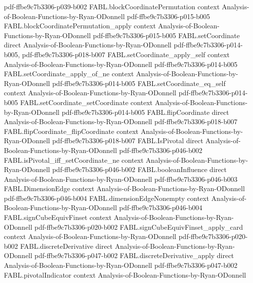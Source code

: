\begin{theorem}
  {pdf-ffbe9c7b3306-p039-b002}
\proofstep
  {FABL.blockCoordinatePermutation}
  {context}
  {Analysis-of-Boolean-Functions-by-Ryan-ODonnell}
  {pdf-ffbe9c7b3306-p015-b005}
\proofstep
  {FABL.blockCoordinatePermutation_apply}
  {context}
  {Analysis-of-Boolean-Functions-by-Ryan-ODonnell}
  {pdf-ffbe9c7b3306-p015-b005}
\proofstep
  {FABL.setCoordinate}
  {direct}
  {Analysis-of-Boolean-Functions-by-Ryan-ODonnell}
  {pdf-ffbe9c7b3306-p014-b005,
    pdf-ffbe9c7b3306-p018-b007}
\proofstep
  {FABL.setCoordinate_apply_self}
  {context}
  {Analysis-of-Boolean-Functions-by-Ryan-ODonnell}
  {pdf-ffbe9c7b3306-p014-b005}
\proofstep
  {FABL.setCoordinate_apply_of_ne}
  {context}
  {Analysis-of-Boolean-Functions-by-Ryan-ODonnell}
  {pdf-ffbe9c7b3306-p014-b005}
\proofstep
  {FABL.setCoordinate_eq_self}
  {context}
  {Analysis-of-Boolean-Functions-by-Ryan-ODonnell}
  {pdf-ffbe9c7b3306-p014-b005}
\proofstep
  {FABL.setCoordinate_setCoordinate}
  {context}
  {Analysis-of-Boolean-Functions-by-Ryan-ODonnell}
  {pdf-ffbe9c7b3306-p014-b005}
\proofstep
  {FABL.flipCoordinate}
  {direct}
  {Analysis-of-Boolean-Functions-by-Ryan-ODonnell}
  {pdf-ffbe9c7b3306-p018-b007}
\proofstep
  {FABL.flipCoordinate_flipCoordinate}
  {context}
  {Analysis-of-Boolean-Functions-by-Ryan-ODonnell}
  {pdf-ffbe9c7b3306-p018-b007}
\proofstep
  {FABL.IsPivotal}
  {direct}
  {Analysis-of-Boolean-Functions-by-Ryan-ODonnell}
  {pdf-ffbe9c7b3306-p046-b002}
\proofstep
  {FABL.isPivotal_iff_setCoordinate_ne}
  {context}
  {Analysis-of-Boolean-Functions-by-Ryan-ODonnell}
  {pdf-ffbe9c7b3306-p046-b002}
\proofstep
  {FABL.booleanInfluence}
  {direct}
  {Analysis-of-Boolean-Functions-by-Ryan-ODonnell}
  {pdf-ffbe9c7b3306-p046-b003}
\proofstep
  {FABL.DimensionEdge}
  {context}
  {Analysis-of-Boolean-Functions-by-Ryan-ODonnell}
  {pdf-ffbe9c7b3306-p046-b004}
\proofstep
  {FABL.dimensionEdgeNonempty}
  {context}
  {Analysis-of-Boolean-Functions-by-Ryan-ODonnell}
  {pdf-ffbe9c7b3306-p046-b004}
\proofstep
  {FABL.signCubeEquivFinset}
  {context}
  {Analysis-of-Boolean-Functions-by-Ryan-ODonnell}
  {pdf-ffbe9c7b3306-p020-b002}
\proofstep
  {FABL.signCubeEquivFinset_apply_card}
  {context}
  {Analysis-of-Boolean-Functions-by-Ryan-ODonnell}
  {pdf-ffbe9c7b3306-p020-b002}
\proofstep
  {FABL.discreteDerivative}
  {direct}
  {Analysis-of-Boolean-Functions-by-Ryan-ODonnell}
  {pdf-ffbe9c7b3306-p047-b002}
\proofstep
  {FABL.discreteDerivative_apply}
  {direct}
  {Analysis-of-Boolean-Functions-by-Ryan-ODonnell}
  {pdf-ffbe9c7b3306-p047-b002}
\proofstep
  {FABL.pivotalIndicator}
  {context}
  {Analysis-of-Boolean-Functions-by-Ryan-ODonnell}

\end{theorem}
